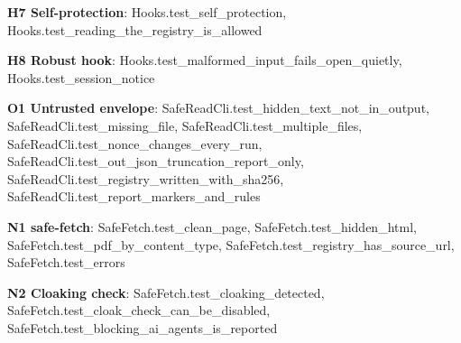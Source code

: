 \documentclass[10pt,a4paper]{article}
\begin{document}
\textbf{H7 Self-protection}: \textcolor{ok}{Hooks.\allowbreak{}test\_\allowbreak{}self\_\allowbreak{}protection}, \textcolor{ok}{Hooks.\allowbreak{}test\_\allowbreak{}reading\_\allowbreak{}the\_\allowbreak{}registry\_\allowbreak{}is\_\allowbreak{}allowed}\par
\textbf{H8 Robust hook}: \textcolor{ok}{Hooks.\allowbreak{}test\_\allowbreak{}malformed\_\allowbreak{}input\_\allowbreak{}fails\_\allowbreak{}open\_\allowbreak{}quietly}, \textcolor{ok}{Hooks.\allowbreak{}test\_\allowbreak{}session\_\allowbreak{}notice}\par
\textbf{O1 Untrusted envelope}: \textcolor{ok}{SafeReadCli.\allowbreak{}test\_\allowbreak{}hidden\_\allowbreak{}text\_\allowbreak{}not\_\allowbreak{}in\_\allowbreak{}output}, \textcolor{ok}{SafeReadCli.\allowbreak{}test\_\allowbreak{}missing\_\allowbreak{}file}, \textcolor{ok}{SafeReadCli.\allowbreak{}test\_\allowbreak{}multiple\_\allowbreak{}files}, \textcolor{ok}{SafeReadCli.\allowbreak{}test\_\allowbreak{}nonce\_\allowbreak{}changes\_\allowbreak{}every\_\allowbreak{}run}, \textcolor{ok}{SafeReadCli.\allowbreak{}test\_\allowbreak{}out\_\allowbreak{}json\_\allowbreak{}truncation\_\allowbreak{}report\_\allowbreak{}only}, \textcolor{ok}{SafeReadCli.\allowbreak{}test\_\allowbreak{}registry\_\allowbreak{}written\_\allowbreak{}with\_\allowbreak{}sha256}, \textcolor{ok}{SafeReadCli.\allowbreak{}test\_\allowbreak{}report\_\allowbreak{}markers\_\allowbreak{}and\_\allowbreak{}rules}\par
\textbf{N1 safe-fetch}: \textcolor{ok}{SafeFetch.\allowbreak{}test\_\allowbreak{}clean\_\allowbreak{}page}, \textcolor{ok}{SafeFetch.\allowbreak{}test\_\allowbreak{}hidden\_\allowbreak{}html}, \textcolor{ok}{SafeFetch.\allowbreak{}test\_\allowbreak{}pdf\_\allowbreak{}by\_\allowbreak{}content\_\allowbreak{}type}, \textcolor{ok}{SafeFetch.\allowbreak{}test\_\allowbreak{}registry\_\allowbreak{}has\_\allowbreak{}source\_\allowbreak{}url}, \textcolor{ok}{SafeFetch.\allowbreak{}test\_\allowbreak{}errors}\par
\textbf{N2 Cloaking check}: \textcolor{ok}{SafeFetch.\allowbreak{}test\_\allowbreak{}cloaking\_\allowbreak{}detected}, \textcolor{ok}{SafeFetch.\allowbreak{}test\_\allowbreak{}cloak\_\allowbreak{}check\_\allowbreak{}can\_\allowbreak{}be\_\allowbreak{}disabled}, \textcolor{ok}{SafeFetch.\allowbreak{}test\_\allowbreak{}blocking\_\allowbreak{}ai\_\allowbreak{}agents\_\allowbreak{}is\_\allowbreak{}reported}\par
\end{document}
